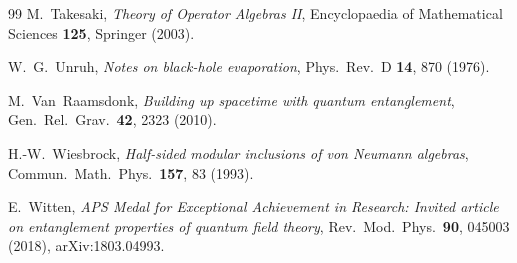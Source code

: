 \documentclass[12pt]{article}
\theoremstyle{definition}
\theoremstyle{remark}
\begin{document}
\begin{thebibliography}{99}
M.~Takesaki,
\emph{Theory of Operator Algebras II},
Encyclopaedia of Mathematical Sciences \textbf{125}, Springer (2003).

W.~G.~Unruh,
\emph{Notes on black-hole evaporation},
Phys.\ Rev.\ D \textbf{14}, 870 (1976).

M.~Van~Raamsdonk,
\emph{Building up spacetime with quantum entanglement},
Gen.\ Rel.\ Grav.\ \textbf{42}, 2323 (2010).

H.-W.~Wiesbrock,
\emph{Half-sided modular inclusions of von Neumann algebras},
Commun.\ Math.\ Phys.\ \textbf{157}, 83 (1993).

E.~Witten,
\emph{APS Medal for Exceptional Achievement in Research: Invited article on entanglement properties of quantum field theory},
Rev.\ Mod.\ Phys.\ \textbf{90}, 045003 (2018),
arXiv:1803.04993.

\end{thebibliography}
 
\end{document}

